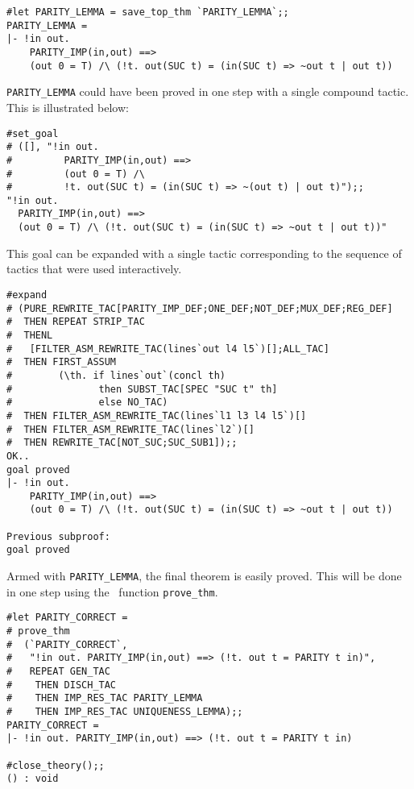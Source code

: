 \begin{session}
\begin{verbatim}
#let PARITY_LEMMA = save_top_thm `PARITY_LEMMA`;;
PARITY_LEMMA =
|- !in out.
    PARITY_IMP(in,out) ==>
    (out 0 = T) /\ (!t. out(SUC t) = (in(SUC t) => ~out t | out t))
\end{verbatim}
\end{session}

{\small\verb|PARITY_LEMMA|} could have been proved in one step with a single
compound tactic. This is illustrated below:

\begin{session}
\begin{verbatim}
#set_goal
# ([], "!in out.
#         PARITY_IMP(in,out) ==>
#         (out 0 = T) /\
#         !t. out(SUC t) = (in(SUC t) => ~(out t) | out t)");;
"!in out.
  PARITY_IMP(in,out) ==>
  (out 0 = T) /\ (!t. out(SUC t) = (in(SUC t) => ~out t | out t))"
\end{verbatim}
\end{session}

\noindent This goal can be expanded with a single tactic corresponding to the
sequence of tactics that were used interactively.

\begin{session}
\begin{verbatim}
#expand
# (PURE_REWRITE_TAC[PARITY_IMP_DEF;ONE_DEF;NOT_DEF;MUX_DEF;REG_DEF]
#  THEN REPEAT STRIP_TAC
#  THENL
#   [FILTER_ASM_REWRITE_TAC(lines`out l4 l5`)[];ALL_TAC]
#  THEN FIRST_ASSUM
#        (\th. if lines`out`(concl th)
#               then SUBST_TAC[SPEC "SUC t" th]
#               else NO_TAC)
#  THEN FILTER_ASM_REWRITE_TAC(lines`l1 l3 l4 l5`)[]
#  THEN FILTER_ASM_REWRITE_TAC(lines`l2`)[]
#  THEN REWRITE_TAC[NOT_SUC;SUC_SUB1]);;
OK..
goal proved
|- !in out.
    PARITY_IMP(in,out) ==>
    (out 0 = T) /\ (!t. out(SUC t) = (in(SUC t) => ~out t | out t))

Previous subproof:
goal proved
\end{verbatim}
\end{session}

Armed with {\small\verb|PARITY_LEMMA|},
the final theorem is easily proved.
This will be done in one step using the \ML\ function
{\small\verb|prove_thm|}.
\vfill
\newpage

\begin{session}
\begin{verbatim}
#let PARITY_CORRECT =
# prove_thm
#  (`PARITY_CORRECT`,
#   "!in out. PARITY_IMP(in,out) ==> (!t. out t = PARITY t in)",
#   REPEAT GEN_TAC
#    THEN DISCH_TAC
#    THEN IMP_RES_TAC PARITY_LEMMA
#    THEN IMP_RES_TAC UNIQUENESS_LEMMA);;
PARITY_CORRECT =
|- !in out. PARITY_IMP(in,out) ==> (!t. out t = PARITY t in)

#close_theory();;
() : void
\end{verbatim}
\end{session}


